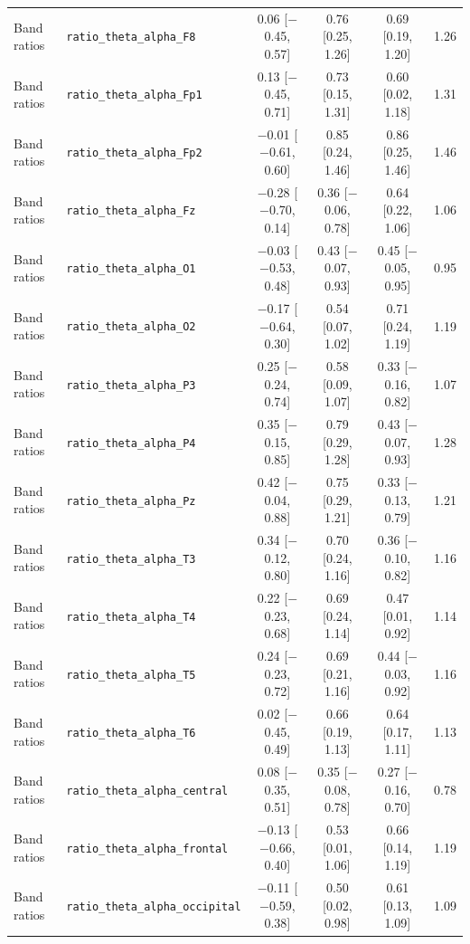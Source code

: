 {\begin{longtable}{llcccc}
Band ratios & \texttt{ratio\_theta\_alpha\_F8} & 0.06 [$-$0.45, 0.57] & 0.76 [0.25, 1.26] & 0.69 [0.19, 1.20] & 1.26 \\
Band ratios & \texttt{ratio\_theta\_alpha\_Fp1} & 0.13 [$-$0.45, 0.71] & 0.73 [0.15, 1.31] & 0.60 [0.02, 1.18] & 1.31 \\
Band ratios & \texttt{ratio\_theta\_alpha\_Fp2} & $-$0.01 [$-$0.61, 0.60] & 0.85 [0.24, 1.46] & 0.86 [0.25, 1.46] & 1.46 \\
Band ratios & \texttt{ratio\_theta\_alpha\_Fz} & $-$0.28 [$-$0.70, 0.14] & 0.36 [$-$0.06, 0.78] & 0.64 [0.22, 1.06] & 1.06 \\
Band ratios & \texttt{ratio\_theta\_alpha\_O1} & $-$0.03 [$-$0.53, 0.48] & 0.43 [$-$0.07, 0.93] & 0.45 [$-$0.05, 0.95] & 0.95 \\
Band ratios & \texttt{ratio\_theta\_alpha\_O2} & $-$0.17 [$-$0.64, 0.30] & 0.54 [0.07, 1.02] & 0.71 [0.24, 1.19] & 1.19 \\
Band ratios & \texttt{ratio\_theta\_alpha\_P3} & 0.25 [$-$0.24, 0.74] & 0.58 [0.09, 1.07] & 0.33 [$-$0.16, 0.82] & 1.07 \\
Band ratios & \texttt{ratio\_theta\_alpha\_P4} & 0.35 [$-$0.15, 0.85] & 0.79 [0.29, 1.28] & 0.43 [$-$0.07, 0.93] & 1.28 \\
Band ratios & \texttt{ratio\_theta\_alpha\_Pz} & 0.42 [$-$0.04, 0.88] & 0.75 [0.29, 1.21] & 0.33 [$-$0.13, 0.79] & 1.21 \\
Band ratios & \texttt{ratio\_theta\_alpha\_T3} & 0.34 [$-$0.12, 0.80] & 0.70 [0.24, 1.16] & 0.36 [$-$0.10, 0.82] & 1.16 \\
Band ratios & \texttt{ratio\_theta\_alpha\_T4} & 0.22 [$-$0.23, 0.68] & 0.69 [0.24, 1.14] & 0.47 [0.01, 0.92] & 1.14 \\
Band ratios & \texttt{ratio\_theta\_alpha\_T5} & 0.24 [$-$0.23, 0.72] & 0.69 [0.21, 1.16] & 0.44 [$-$0.03, 0.92] & 1.16 \\
Band ratios & \texttt{ratio\_theta\_alpha\_T6} & 0.02 [$-$0.45, 0.49] & 0.66 [0.19, 1.13] & 0.64 [0.17, 1.11] & 1.13 \\
Band ratios & \texttt{ratio\_theta\_alpha\_central} & 0.08 [$-$0.35, 0.51] & 0.35 [$-$0.08, 0.78] & 0.27 [$-$0.16, 0.70] & 0.78 \\
Band ratios & \texttt{ratio\_theta\_alpha\_frontal} & $-$0.13 [$-$0.66, 0.40] & 0.53 [0.01, 1.06] & 0.66 [0.14, 1.19] & 1.19 \\
Band ratios & \texttt{ratio\_theta\_alpha\_occipital} & $-$0.11 [$-$0.59, 0.38] & 0.50 [0.02, 0.98] & 0.61 [0.13, 1.09] & 1.09 \\

\end{longtable}}
